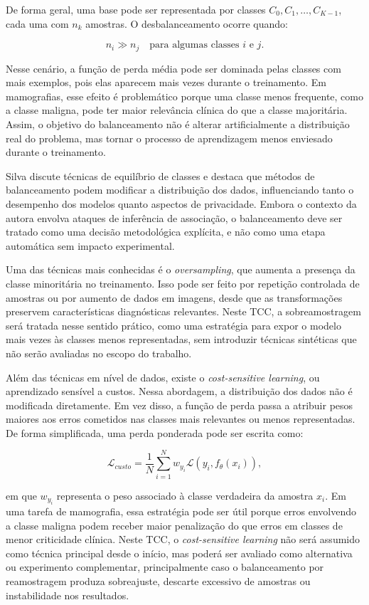 \documentclass[
    12pt,
    openright,
    oneside,
    a4paper,
    english,
    brazil
]{abntex2}
\begin{document}
De forma geral, uma base pode ser representada por classes \(C_0, C_1, \ldots, C_{K-1}\), cada uma com \(n_k\) amostras. O desbalanceamento ocorre quando:

\[
n_i \gg n_j
\quad \text{para algumas classes } i \text{ e } j.
\]

Nesse cenário, a função de perda média pode ser dominada pelas classes com mais exemplos, pois elas aparecem mais vezes durante o treinamento. Em mamografias, esse efeito é problemático porque uma classe menos frequente, como a classe maligna, pode ter maior relevância clínica do que a classe majoritária. Assim, o objetivo do balanceamento não é alterar artificialmente a distribuição real do problema, mas tornar o processo de aprendizagem menos enviesado durante o treinamento.

Silva \cite{silva2025balanceamento} discute técnicas de equilíbrio de classes e destaca que métodos de balanceamento podem modificar a distribuição dos dados, influenciando tanto o desempenho dos modelos quanto aspectos de privacidade. Embora o contexto da autora envolva ataques de inferência de associação, o balanceamento deve ser tratado como uma decisão metodológica explícita, e não como uma etapa automática sem impacto experimental.

Uma das técnicas mais conhecidas é o \textit{oversampling}, que aumenta a presença da classe minoritária no treinamento. Isso pode ser feito por repetição controlada de amostras ou por aumento de dados em imagens, desde que as transformações preservem características diagnósticas relevantes. Neste TCC, a sobreamostragem será tratada nesse sentido prático, como uma estratégia para expor o modelo mais vezes às classes menos representadas, sem introduzir técnicas sintéticas que não serão avaliadas no escopo do trabalho.

Além das técnicas em nível de dados, existe o \textit{cost-sensitive learning}, ou aprendizado sensível a custos. Nessa abordagem, a distribuição dos dados não é modificada diretamente. Em vez disso, a função de perda passa a atribuir pesos maiores aos erros cometidos nas classes mais relevantes ou menos representadas. De forma simplificada, uma perda ponderada pode ser escrita como:

\[
\mathcal{L}_{custo} =
\frac{1}{N}
\sum_{i=1}^{N}
w_{y_i}\mathcal{L}(y_i, f_{\theta}(x_i)),
\]

em que \(w_{y_i}\) representa o peso associado à classe verdadeira da amostra \(x_i\). Em uma tarefa de mamografia, essa estratégia pode ser útil porque erros envolvendo a classe maligna podem receber maior penalização do que erros em classes de menor criticidade clínica. Neste TCC, o \textit{cost-sensitive learning} não será assumido como técnica principal desde o início, mas poderá ser avaliado como alternativa ou experimento complementar, principalmente caso o balanceamento por reamostragem produza sobreajuste, descarte excessivo de amostras ou instabilidade nos resultados.
\end{document}
